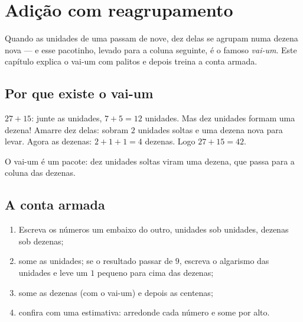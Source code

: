\chapter{Adição com reagrupamento}\label{ch:g2:addition}

Quando as unidades de uma  passam de nove, dez delas se agrupam
numa dezena nova --- e esse pacotinho, levado para a coluna
seguinte, é o famoso \emph{vai-um}. Este capítulo explica o vai-um
com palitos e depois treina a conta armada.

\section{Por que existe o vai-um}

\begin{example}\label{ex:g2:addition:bundle}
$27 + 15$: junte as unidades, $7 + 5 = 12$ unidades. Mas dez
unidades formam uma dezena! Amarre dez delas: sobram $2$ unidades
soltas e uma dezena nova para levar. Agora as dezenas:
$2 + 1 + 1 = 4$ dezenas. Logo $27 + 15 = 42$.
\end{example}

\begin{omfigure}

{\small O vai-um é um pacote: dez unidades soltas viram uma dezena,
que passa para a coluna das dezenas.}
\end{omfigure}

\section{A conta armada}

\begin{method}\label{met:g2:addition:column}
\begin{enumerate}
  \item Escreva os números um embaixo do outro, unidades sob
        unidades, dezenas sob dezenas;
  \item some as unidades; se o resultado passar de $9$, escreva o
        algarismo das unidades e leve um $1$ pequeno para cima das
        dezenas;
  \item some as dezenas (com o vai-um) e depois as centenas;
  \item confira com uma estimativa: arredonde cada número e some por
        alto.
\end{enumerate}
\end{method}

